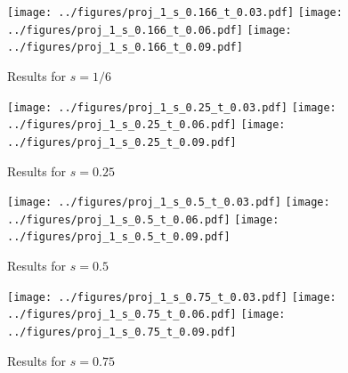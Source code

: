 \documentclass[twocolumn,10pt]{asme2ej}
\begin{document}
%

%


\clearpage
\begin{figure}[b]
\begin{center}
\texttt{[image: ../figures/proj\_1\_s\_0.166\_t\_0.03.pdf]}
\texttt{[image: ../figures/proj\_1\_s\_0.166\_t\_0.06.pdf]}
\texttt{[image: ../figures/proj\_1\_s\_0.166\_t\_0.09.pdf]}
\caption{Results for $s = 1/6$}
\end{center}
\end{figure}

\begin{figure}[htb]
\begin{center}
\texttt{[image: ../figures/proj\_1\_s\_0.25\_t\_0.03.pdf]}
\texttt{[image: ../figures/proj\_1\_s\_0.25\_t\_0.06.pdf]}
\texttt{[image: ../figures/proj\_1\_s\_0.25\_t\_0.09.pdf]}
\caption{Results for $s = 0.25$}
\end{center}
\end{figure}

\begin{figure}[htb]
\begin{center}
\texttt{[image: ../figures/proj\_1\_s\_0.5\_t\_0.03.pdf]}
\texttt{[image: ../figures/proj\_1\_s\_0.5\_t\_0.06.pdf]}
\texttt{[image: ../figures/proj\_1\_s\_0.5\_t\_0.09.pdf]}
\caption{Results for $s = 0.5$}
\end{center}
\end{figure}

\begin{figure}[htb]
\begin{center}
\texttt{[image: ../figures/proj\_1\_s\_0.75\_t\_0.03.pdf]}
\texttt{[image: ../figures/proj\_1\_s\_0.75\_t\_0.06.pdf]}
\texttt{[image: ../figures/proj\_1\_s\_0.75\_t\_0.09.pdf]}
\caption{Results for $s = 0.75$}
\end{center}
\end{figure}

\clearpage
\onecolumn
\appendix       %
\end{document}
